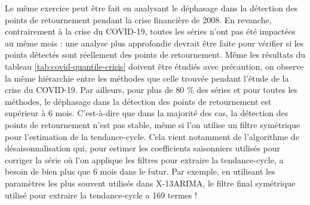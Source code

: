 \documentclass[
  11pt,
  french,
  a4paper]{article}
\newcommand\1{\mathds{1}}
\begin{document}
Le même exercice peut être fait en analysant le déphasage dans la détection des points de retournement pendant la crise financière de 2008.
En revanche, contrairement à la crise du COVID-19, toutes les séries n'ont pas été impactées au même mois : une analyse plus approfondie devrait être faite pour vérifier si les points détectés sont réellement des points de retournement.
Même les résultats du tableau \ref{tab:covid-quantile-crisis} doivent être étudiés avec précaution, on observe la même hiérarchie entre les méthodes que celle trouvée pendant l'étude de la crise du COVID-19.
Par ailleurs, pour plus de 80 \% des séries et pour toutes les méthodes, le déphasage dans la détection des points de retournement est supérieur à 6 mois.
C'est-à-dire que dans la majorité des cas, la détection des points de retournement n'est pas stable, même si l'on utilise un filtre symétrique pour l'estimation de la tendance-cycle.
Cela vient notamment de l'algorithme de désaisonnalisation qui, pour estimer les coefficients saisonniers utilisés pour corriger la série où l'on applique les filtres pour extraire la tendance-cycle, a besoin de bien plus que 6 mois dans le futur.
Par exemple, en utilisant les paramètres les plus souvent utilisés dans X-13ARIMA, le filtre final symétrique utilisé pour extraire la tendance-cycle a 169 termes !
\end{document}
